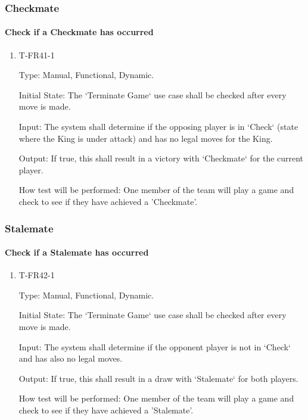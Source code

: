 \documentclass[12pt, titlepage]{article}
\begin{document}
\subsubsection{Checkmate}

    \paragraph{Check if a Checkmate has occurred}

            \begin{enumerate}

            \item{T-FR41-1\\}

                Type: Manual, Functional, Dynamic.
                					
                Initial State: The ‘Terminate Game‘ use case shall be checked after every move is made.
                					
                Input: The system shall determine if the opposing player is in ‘Check‘ (state where the King is under attack) and has no legal moves for the King.
                					
                Output: If true, this shall result in a victory with ‘Checkmate‘ for the current player.

                How test will be performed: One member of the team will play a game and check to see if they have achieved a 'Checkmate'.

            \end{enumerate}

\subsubsection{Stalemate}

    \paragraph{Check if a Stalemate has occurred}

            \begin{enumerate}

            \item{T-FR42-1\\}

                Type: Manual, Functional, Dynamic.
                					
                Initial State: The ‘Terminate Game‘ use case shall be checked after every move is made.
                					
                Input: The system shall determine if the opponent player is not in ‘Check‘ and has also no legal moves.
                					
                Output: If true, this shall result in a draw with ‘Stalemate‘ for both players.

                How test will be performed: One member of the team will play a game and check to see if they have achieved a 'Stalemate'.

            \end{enumerate}
\end{document}
